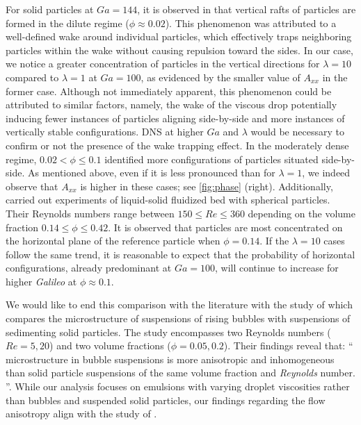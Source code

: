 \documentclass[11pt]{My_preprint}
\providecommand{\DIFadd}[1]{{\protect\color{blue}\uwave{#1}}} %
\providecommand{\DIFdel}[1]{{\protect\color{red}\sout{#1}}}                      %
\providecommand{\DIFaddbegin}{} %
\providecommand{\DIFaddend}{} %
\providecommand{\DIFdelbegin}{} %
\providecommand{\DIFdelend}{} %
\begin{document}
For solid particles at $Ga = 144$, it is observed in \citet{shajahan2023inertial} that vertical rafts of particles are formed in the dilute regime ($\phi \approx 0.02$). This phenomenon was attributed to a well-defined wake around individual particles, which effectively traps neighboring particles within the wake without causing repulsion toward the sides. In our case, we notice a greater concentration of particles in the vertical directions for $\lambda = 10$ compared to $\lambda = 1$ at \DIFdelbegin \DIFdel{$Ga = 100$}\DIFdelend \DIFaddbegin \DIFadd{$Ga = 80$}\DIFaddend , as evidenced by the smaller value of $A_{xx}$ in the former case. Although not immediately apparent, this phenomenon could be attributed to similar factors, namely, the wake of the viscous drop potentially inducing fewer instances of particles aligning side-by-side and more instances of vertically stable configurations. DNS at higher $Ga$ and $\lambda$ would be necessary to confirm or not the presence of the wake trapping effect. In the moderately dense regime,  $0.02 < \phi \le 0.1$  \citet{shajahan2023inertial} identified more configurations of particles situated side-by-side. 
As mentioned above, even if it is less pronounced than for $\lambda = 1$, we indeed observe that $A_{xx}$ is higher in these cases; see \ref{fig:phase} (right). 
Additionally, \citet{almeras2021statistics} carried out experiments of liquid-solid fluidized bed with spherical particles. 
Their Reynolds numbers range between $150\leq Re \leq 360$ depending on the volume fraction $0.14 \leq \phi \leq 0.42$.
It is observed that particles are most concentrated on the horizontal plane of the reference particle when $\phi = 0.14$.
If the $\lambda = 10$ cases follow the same trend, it is reasonable to expect that the probability of horizontal configurations, already predominant at \DIFdelbegin \DIFdel{$Ga =100$}\DIFdelend \DIFaddbegin \DIFadd{$Ga =80$}\DIFaddend , will continue to increase for higher \textit{Galileo} at $\phi  \approx 0.1$.

We would like to end this comparison with the literature with the study of \citet{yin2008lattice} which compares the microstructure of suspensions of rising bubbles with suspensions of sedimenting solid particles.
The study encompasses two Reynolds numbers ($Re = 5, 20$) and two volume fractions ($\phi = 0.05, 0.2$). Their findings reveal that: 
\enquote{    
     microstructure in bubble
    suspensions is more anisotropic and inhomogeneous than
    solid particle suspensions of the same volume fraction and
    \textit{Reynolds} number.    
}. 
While our analysis focuses on emulsions with varying droplet viscosities rather than bubbles and suspended solid particles, our findings regarding the flow anisotropy align with the study of \citet{yin2008lattice}. 
\end{document}
